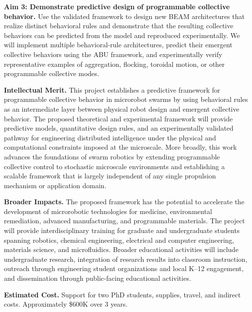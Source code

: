\documentclass[11pt]{article}
\begin{document}
\textbf{Aim 3: Demonstrate predictive design of programmable collective behavior.}
Use the validated framework to design new BEAM architectures that realize distinct behavioral rules and demonstrate that the resulting collective behaviors can be predicted from the model and reproduced experimentally.
We will implement multiple behavioral-rule architectures, predict their emergent collective behaviors using the ABU framework, and experimentally verify representative examples of aggregation, flocking, toroidal motion, or other programmable collective modes.

\textbf{Intellectual Merit.} %
This project establishes a predictive framework for programmable collective behavior in microrobot swarms by using behavioral rules as an intermediate layer between physical robot design and emergent collective behavior.
The proposed theoretical and experimental framework will provide predictive models, quantitative design rules, and an experimentally validated pathway for engineering distributed intelligence under the physical and computational constraints imposed at the microscale.
More broadly, this work advances the foundations of swarm robotics by extending programmable collective control to stochastic microscale environments and establishing a scalable framework that is largely independent of any single propulsion mechanism or application domain.

\textbf{Broader Impacts.} %
The proposed framework has the potential to accelerate the development of microrobotic technologies for medicine, environmental remediation, advanced manufacturing, and programmable materials. 
The project will provide interdisciplinary training for graduate and undergraduate students spanning robotics, chemical engineering, electrical and computer engineering, materials science, and microfluidics. 
Broader educational activities will include undergraduate research, integration of research results into classroom instruction, outreach through engineering student organizations and local K--12 engagement, and dissemination through public-facing educational activities.

\textbf{Estimated Cost.} 
Support for two PhD students, supplies, travel, and indirect costs. Approximately \$600K over 3 years.
\end{document}
